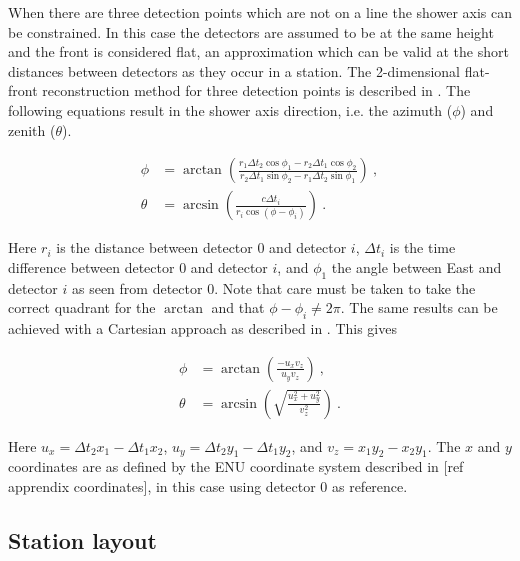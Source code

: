 When there are three detection points which are not on a line the shower axis can be constrained. In this case the detectors are assumed to be at the same height and the front is considered flat, an approximation which can be valid at the short distances between detectors as they occur in a station. The 2-dimensional flat-front reconstruction method for three detection points is described in \cite{fokkema2012hisparc}. The following equations result in the shower axis direction, i.e. the azimuth ($\phi$) and zenith ($\theta$).

\begin{equation}
    \label{eq:direction-2dflat}
    \begin{split}
        \phi &= \arctan \left(\frac{r_1 \Delta t_2 \cos \phi_1 - r_2 \Delta t_1 \cos \phi_2}{r_2 \Delta t_1 \sin \phi_2 - r_1 \Delta t_2 \sin \phi_1} \right) \ , \\
        \theta &= \arcsin \left(\frac{c \Delta t_i}{r_i \cos(\phi - \phi_i)} \right) \ .
    \end{split}
\end{equation}

Here $r_i$ is the distance between detector 0 and detector $i$, $\Delta t_i$ is the time difference between detector 0 and detector $i$, and $\phi_1$ the angle between East and detector $i$ as seen from detector 0. Note that care must be taken to take the correct quadrant for the $\arctan$ and that $\phi - \phi_i \ne 2 \pi$. The same results can be achieved with a Cartesian approach as described in \cite{montanus2015direction}. This gives 

\begin{equation}
    \label{eq:direction-2dflat}
    \begin{split}
        \phi &= \arctan \left(\frac{-u_x v_z}{u_y v_z} \right) \ , \\
        \theta &= \arcsin \left(\sqrt{\frac{u_x^2+u_y^2}{v_z^2}} \right) \ .
    \end{split}
\end{equation}

Here $u_x = \Delta t_2 x_1 - \Delta t_1 x_2$, $u_y = \Delta t_2 y_1 - \Delta t_1 y_2$, and $v_z = x_1 y_2 - x_2 y_1$. The $x$ and $y$ coordinates are as defined by the ENU coordinate system described in [ref apprendix coordinates], in this case using detector 0 as reference.

\subsection{Station layout}
\label{ssec:station_layout}

